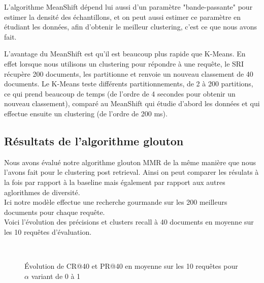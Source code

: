 \documentclass{article}
\begin{document}
L'algorithme MeanShift dépend lui aussi d'un paramètre "bande-passante" pour estimer la densité des échantillons, et on peut aussi estimer ce paramètre en étudiant les données, afin d'obtenir le meilleur clustering, c'est ce que nous avons fait.

L'avantage du MeanShift est qu'il est beaucoup plus rapide que K-Means. En effet lorsque nous utilisons un clustering pour répondre à une requête, le SRI récupère 200 documents, les partitionne et renvoie un nouveau classement de 40 documents.
Le K-Means teste différents partitionnements, de 2 à 200 partitions, ce qui prend beaucoup de temps (de l'ordre de 4 secondes pour obtenir un nouveau classement), comparé au MeanShift qui étudie d'abord les données et qui effectue ensuite un clustering (de l'ordre de 200 ms).

\subsection{Résultats de l'algorithme glouton}
Nous avons évalué notre algorithme glouton MMR de la même manière que nous l'avons fait pour le clustering post retrieval. Ainsi on peut comparer les résulats à la fois par rapport à la baseline mais également par rapport aux autres aglorithmes de diversité. \\
Ici notre modèle effectue une recherche gourmande sur les 200 meilleurs documents pour chaque requête.\\
Voici l'évolution des précisions et clusters recall à 40 documents en moyenne sur les 10 requêtes d'évaluation.

\begin{figure}[htp]
 \caption{ Évolution de CR@40 et PR@40 en moyenne sur les 10 requêtes pour $\alpha$ variant de 0 à 1 }
  \centering
  ~
\end{figure} 
\end{document}
